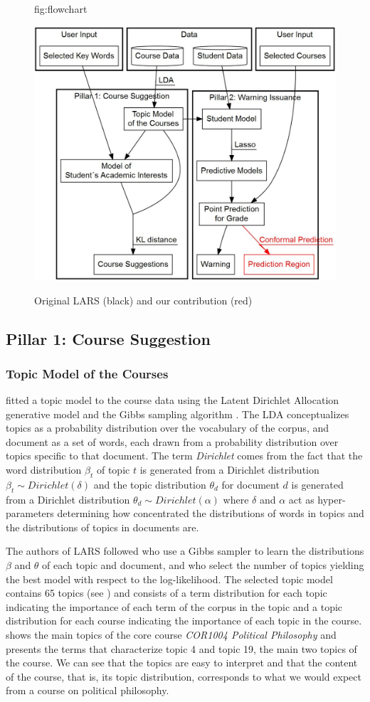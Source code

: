 \documentclass[pmlr]{jmlr}%
\begin{document}
\begin{figure}[htbp]
	\floatconts
	{fig:flowchart}
	{\caption{Original LARS (black) and our contribution (red)}}
	{\includegraphics[width=0.5\linewidth]{figures/flowchart}}
\end{figure}

\subsection{Pillar 1: Course Suggestion}

\subsubsection{Topic Model of the Courses}
\label{sec:tm}

\citet{Morsomme.2019} fitted a topic model to the course data using the Latent Dirichlet Allocation generative model \citep{Blei.2003} and the Gibbs sampling algorithm \citep{Phan.2008}. The LDA conceptualizes topics as a probability distribution over the vocabulary of the corpus, and document as a set of words, each drawn from a probability distribution over topics specific to that document. The term \textit{Dirichlet} comes from the fact that the word distribution $\beta_{t}$ of topic $t$ is generated from a Dirichlet distribution $\beta_{t} \sim Dirichlet(\delta)$ and the topic distribution $\theta_{d}$ for document $d$ is generated from a Dirichlet distribution $\theta_{d} \sim Dirichlet(\alpha)$ where $\delta$ and $\alpha$ act as hyper-parameters determining how concentrated the distributions of words in topics and the distributions of topics in documents are.

The authors of LARS followed \citet{Phan.2008} who use a Gibbs sampler to learn the distributions $\beta$ and $\theta$ of each topic and document, and \citet{Griffiths.2004} who select the number of topics yielding the best model with respect to the log-likelihood. The selected topic model contains 65 topics (see ) and consists of a term distribution for each topic indicating the importance of each term of the corpus in the topic and a topic distribution for each course indicating the importance of each topic in the course.  shows the main topics of the core course \textit{COR1004 Political Philosophy} and  presents the terms that characterize topic 4 and topic 19, the main two topics of the course. We can see that the topics are easy to interpret and that the content of the course, that is, its topic distribution, corresponds to what we would expect from a course on political philosophy.
\end{document}
